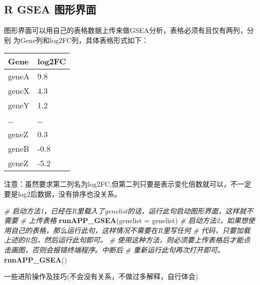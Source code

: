 \documentclass[
]{book}
\newenvironment{Shaded}{\begin{snugshade}}{\end{snugshade}}
\newcommand{\AttributeTok}[1]{\textcolor[rgb]{0.13,0.29,0.53}{#1}}
\newcommand{\CommentTok}[1]{\textcolor[rgb]{0.56,0.35,0.01}{\textit{#1}}}
\newcommand{\FunctionTok}[1]{\textcolor[rgb]{0.13,0.29,0.53}{\textbf{#1}}}
\newcommand{\NormalTok}[1]{#1}
\begin{document}
\subsection{R GSEA 图形界面}\label{r-gsea-ux56feux5f62ux754cux9762}

图形界面可以用自己的表格数据上传来做GSEA分析，表格必须有且仅有两列，分别
为Gene列和log2FC列，具体表格形式如下：

\begin{longtable}[]{@{}ll@{}}
\toprule\noalign{}
Gene & log2FC \\
\midrule\noalign{}
\endhead
\bottomrule\noalign{}
\endlastfoot
geneA & 9.8 \\
geneX & 4.3 \\
geneY & 1.2 \\
\ldots{} & \ldots{} \\
geneZ & 0.3 \\
geneB & -0.8 \\
geneZ & -5.2 \\
\end{longtable}

注意：虽然要求第二列名为log2FC,但第二列只要是表示变化倍数就可以，不一定要是log2后数据，没有排序也没关系。

\begin{Shaded}
\begin{Highlighting}[]
\CommentTok{\# 启动方法1，已经在R里载入了genelist的话，运行此句启动图形界面，这样就不需要}
\CommentTok{\#   上传表格}
\FunctionTok{runAPP\_GSEA}\NormalTok{(}\AttributeTok{genelist =}\NormalTok{ genelist)}
\CommentTok{\# 启动方法2，如果想使用自己的表格，那么运行此句，这样情况不需要在R里写任何}
\CommentTok{\#  代码，只要加载上述的R包，然后运行此句即可。}
\CommentTok{\#  使用这种方法，则必须要上传表格后才能点击画图，否则会报错终端程序。中断后}
\CommentTok{\#  重新运行此句再次打开即可。}
\FunctionTok{runAPP\_GSEA}\NormalTok{()}
\end{Highlighting}
\end{Shaded}

一些进阶操作及技巧(不会没有关系，不做过多解释，自行体会)
\end{document}
